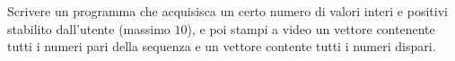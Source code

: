 \begin{Exercise}[label={ex:pari_dispari}]
		Scrivere un programma che acquisisca un certo numero di valori interi e positivi stabilito dall'utente (massimo $10$), e poi stampi a video un vettore contenente tutti i numeri pari della sequenza e un vettore contente tutti i numeri dispari.
\end{Exercise}

\begin{Answer}[ref={ex:pari_dispari}]
  
\end{Answer}